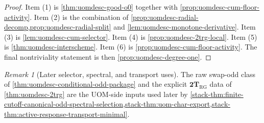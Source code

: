 \documentclass[11pt]{article}
\theoremstyle{definition}
\theoremstyle{plain}
\theoremstyle{remark}
\newtheorem{remark}[definition]{Remark}
\begin{document}
\begin{proof}
Item (1) is \cref{thm:uomdesc-good-o0} together with
\cref{prop:uomdesc-cum-floor-activity}.
Item (2) is the combination of \cref{prop:uomdesc-radial-decomp,prop:uomdesc-radial-split}
and \cref{lem:uomdesc-monotone-derivative}.
Item (3) is \cref{lem:uomdesc-cum-selector}.
Item (4) is \cref{prop:uomdesc-2trg-local}.
Item (5) is \cref{thm:uomdesc-interscheme}.
Item (6) is \cref{prop:uomdesc-cum-floor-activity}.
The final nontriviality statement is then \cref{prop:uomdesc-degree-one}.
\end{proof}

\begin{remark}[Later selector, spectral, and transport uses]
\label{rem:uomdesc-fit}
The raw swap-odd class of \cref{thm:uomdesc-conditional-odd-package} and the explicit
\(\mathbf{2T}_{\mathrm{RG}}\) data of \cref{thm:uomdesc-2trg} are the UOM-side inputs used later
by
\cref{stack-thm:finite-cutoff-canonical-odd-spectral-selection,stack-thm:uom-char-export,stack-thm:active-response-transport-minimal}.
\end{remark}
\end{document}
